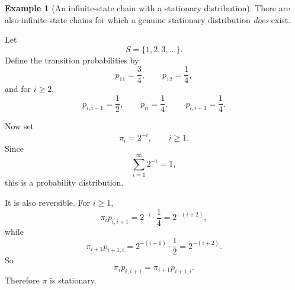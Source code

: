 \documentclass[11pt]{article}
\theoremstyle{definition}
\newtheorem{example}[theorem]{Example}
\begin{document}
\begin{example}[An infinite-state chain with a stationary distribution]
There are also infinite-state chains for which a genuine stationary distribution \emph{does} exist.

Let
\[
S=\{1,2,3,\dots\}.
\]
Define the transition probabilities by
\[
p_{11}=\frac34,
\qquad
p_{12}=\frac14,
\]
and for \(i\ge 2\),
\[
p_{i,i-1}=\frac12,
\qquad
p_{ii}=\frac14,
\qquad
p_{i,i+1}=\frac14.
\]

Now set
\[
\pi_i=2^{-i},
\qquad i\ge 1.
\]
Since
\[
\sum_{i=1}^{\infty} 2^{-i}=1,
\]
this is a probability distribution.

It is also reversible. For \(i\ge 1\),
\[
\pi_i p_{i,i+1}
=
2^{-i}\cdot \frac14
=
2^{-(i+2)},
\]
while
\[
\pi_{i+1}p_{i+1,i}
=
2^{-(i+1)}\cdot \frac12
=
2^{-(i+2)}.
\]
So
\[
\pi_i p_{i,i+1}=\pi_{i+1}p_{i+1,i}.
\]
Therefore \(\pi\) is stationary.
\end{example}
\end{document}

